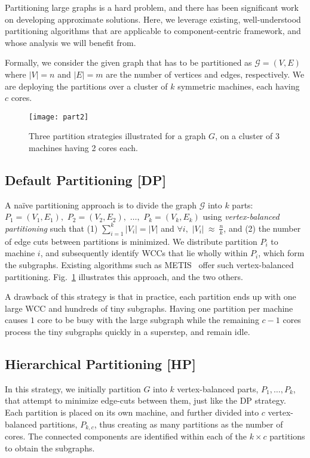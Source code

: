 \documentclass[10pt,conference, compsocconf]{IEEEtran}
\begin{document}
Partitioning large graphs is a hard problem, and there has been significant work on developing approximate solutions. Here, we leverage existing, well-understood partitioning algorithms that are applicable to component-centric framework, and whose analysis we will benefit from. 



Formally, we consider the given graph that has to be partitioned as $\mathcal{G} = (V,E)$ where $|V| = n$ and $|E| = m$ are the number of vertices and edges, respectively. We are deploying the partitions over a cluster of $k$ symmetric machines, each having $c$ cores. 




\begin{figure}[t]
\centering \texttt{[image: part2]}
\caption{Three partition strategies illustrated for a graph $G$, on a cluster of 3 machines having 2 cores each.}
\label{fig:strategy}
\vspace{-0.1in}
\end{figure}
\subsection{Default Partitioning [DP]} 

A na\"{i}ve partitioning approach is to divide the graph $\mathcal{G}$ into $k$ parts: $P_1 = (V_1,E_1),$ $P_2 = (V_2,E_2),$ $\ldots,$ $P_k = (V_k, E_k)$ using \emph{vertex-balanced partitioning} such that (1) $\sum_{i=1}^{k}|V_i| = |V|$ and $\forall i,$ $|V_i|~\approx~\frac{n}{k}$, and (2) the number of edge cuts between partitions is minimized. We distribute partition $P_i$ to machine $i$, and subsequently identify WCCs that lie wholly within $P_i$, which form the subgraphs. Existing algorithms such as METIS~\cite{metis} offer such vertex-balanced partitioning. Fig.~\ref{fig:strategy} illustrates this approach, and the two others.

A drawback of this strategy is that in practice, each partition ends up with one large WCC and hundreds of tiny subgraphs. Having one partition per machine causes $1$ core to be busy with the large subgraph while the remaining $c-1$ cores process the tiny subgraphs quickly in a superstep, and remain idle.

\subsection{Hierarchical Partitioning [HP]} In this strategy, we initially partition $G$ into $k$ vertex-balanced parts, $P_1, \ldots, P_k$, that attempt to minimize edge-cuts between them, just like the DP strategy. Each partition is placed on its own machine, and further divided into $c$ vertex-balanced partitions, $P_{k,c}$, thus creating as many partitions as the number of cores. The connected components are identified within each of the $k \times c$ partitions to obtain the subgraphs. 
\end{document}
